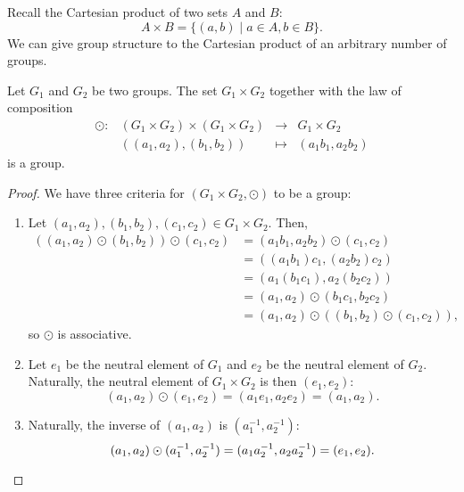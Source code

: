 Recall the Cartesian product of two sets $ A $ and $ B $:
\begin{equation*}
    A\times B=\{(a,b)\mid a\in A,b\in B\}.
\end{equation*}
We can give group structure to the Cartesian product of an arbitrary number of groups.

\begin{prop}\label{prop:direct_product}
Let $ G_1 $ and $ G_2 $ be two groups. The set $ G_1\times G_2 $ together with the law of composition
\begin{equation*}
    \begin{array}{rccc}
        \odot: & (G_1\times G_2)\times(G_1\times G_2) & \to & G_1\times G_2 \\
        & ((a_1,a_2),(b_1,b_2)) & \mapsto & (a_1b_1,a_2b_2)
    \end{array}
\end{equation*}
is a group.
\end{prop}
\begin{proof}
We have three criteria for $ (G_1\times G_2,\odot) $ to be a group:
\begin{enumerate}
    \item Let $ (a_1,a_2),(b_1,b_2),(c_1,c_2)\in G_1\times G_2 $. Then,
    \begin{align*}
        ((a_1,a_2)\odot(b_1,b_2))\odot(c_1,c_2) &= (a_1b_1,a_2b_2)\odot(c_1,c_2) \\
        &= ((a_1b_1)c_1,(a_2b_2)c_2) \\
        &= (a_1(b_1c_1),a_2(b_2c_2)) \\
        &= (a_1,a_2)\odot(b_1c_1,b_2c_2) \\
        &= (a_1,a_2)\odot((b_1,b_2)\odot(c_1,c_2)),
    \end{align*}
    so $ \odot $ is associative.
    \item Let $ e_1 $ be the neutral element of $ G_1 $ and $ e_2 $ be the neutral element of $ G_2 $. Naturally, the neutral element of $ G_1\times G_2 $ is then $ (e_1,e_2) $:
    \begin{equation*}
        (a_1,a_2)\odot(e_1,e_2)=(a_1e_1,a_2e_2)=(a_1,a_2).
    \end{equation*}
    \item Naturally, the inverse of $ (a_1,a_2) $ is $ (a_1^{-1},a_2^{-1}) $:
    \begin{equation*}
        (a_1,a_2)\odot(a_1^{-1},a_2^{-1})=(a_1a_2^{-1},a_2a_2^{-1})=(e_1,e_2).\qedhere
    \end{equation*}
\end{enumerate}
\end{proof}

